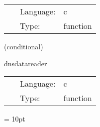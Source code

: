 \hspace{5mm}

 \begin{tabular*}{160mm}{cll} 
~ & Language:  & c \\ 
~ & Type:  & function \\ 
\end{tabular*} 


\vspace{5mm}

   (conditional) 

\hspace{5mm} dnsdatareader 

\hspace{5mm}{\it read binary neutron star initial data } 


\hspace{5mm}

 \begin{tabular*}{160mm}{cll} 
~ & Language:  & c \\ 
~ & Type:  & function \\ 
\end{tabular*} 



\vspace{5mm}\parskip = 10pt 

